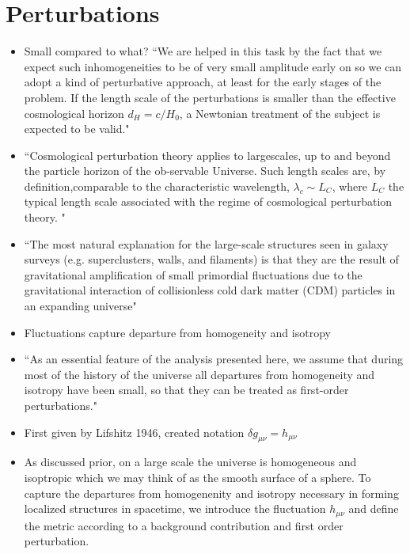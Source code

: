 \documentclass[10pt,letterpaper]{article}
\numberwithin{equation}{section}
\begin{document}
\section*{Perturbations}
\begin{itemize}
	\item Small compared to what? ``We are helped in this task by the fact that we expect such inhomogeneities to be of very small amplitude early on so we can adopt a kind of perturbative approach, at least for the early stages of the problem. If the length scale of the perturbations is smaller than the effective cosmological horizon $d_H = c / H_0$, a Newtonian treatment of the subject is expected to be valid."
	\item ``Cosmological   perturbation   theory   applies   to   largescales, up to and beyond the particle horizon of the ob-servable Universe.  Such length scales are, by definition,comparable  to  the  characteristic  wavelength, $\lambda_c \sim L_C$, where $L_C$ the typical length scale associated with the regime of cosmological perturbation theory. "
	\item ``The most natural explanation for the large-scale structures seen in galaxy surveys (e.g. superclusters, walls, and filaments) is that they are the result of gravitational amplification of small primordial fluctuations due to the gravitational interaction of collisionless cold dark matter (CDM) particles in an expanding universe"
	\item Fluctuations capture departure from homogeneity and isotropy
	\item ``As an essential feature of the analysis presented here, we assume that during most of the history of the universe all departures from homogeneity and isotropy have been small, so that they can be treated as first-order perturbations."
	\item First given by Lifshitz 1946, created notation $\delta g_{\mu\nu} = h_{\mu\nu}$
	\item As discussed prior, on a large scale the universe is homogeneous and isoptropic which we may think of as the smooth surface of a sphere. To capture the departures from homogenenity and isotropy necessary in forming localized structures in spacetime, we introduce the fluctuation $h_{\mu\nu}$ and define the metric according to a background contribution and first order perturbation. 
	\end{itemize}
	
\end{document}
